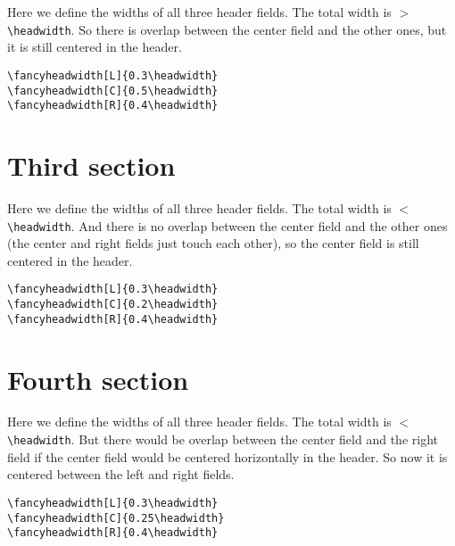 \documentclass[oneside]{report}
\begin{document}
\noindent\begin{boxedminipage}{\textwidth}
  Here we define the widths of all three header fields. The total width
  is $>$ \verb|\headwidth|. So there is overlap between the center field
  and the other ones, but it is still centered in the header.
\begin{verbatim}
\fancyheadwidth[L]{0.3\headwidth}
\fancyheadwidth[C]{0.5\headwidth}
\fancyheadwidth[R]{0.4\headwidth}
\end{verbatim}
\end{boxedminipage}

\fancyheadwidth[L]{0.3\headwidth}
\fancyheadwidth[C]{0.5\headwidth}
\fancyheadwidth[R]{0.4\headwidth}

\newpage

\section{Third section}


\noindent\begin{boxedminipage}{\textwidth}
  Here we define the widths of all three header fields. The total width
  is $<$ \verb|\headwidth|. And there is no overlap between the center
  field and the other ones (the center and right fields just touch each other),
  so the center field is still centered in the header.

\begin{verbatim}
\fancyheadwidth[L]{0.3\headwidth}
\fancyheadwidth[C]{0.2\headwidth}
\fancyheadwidth[R]{0.4\headwidth}
\end{verbatim}
\end{boxedminipage}

\fancyheadwidth[L]{0.3\headwidth}
\fancyheadwidth[C]{0.2\headwidth}
\fancyheadwidth[R]{0.4\headwidth}

\newpage

\section{Fourth section}

\noindent\begin{boxedminipage}{\textwidth}
  Here we define the widths of all three header fields. The total width
  is $<$ \verb|\headwidth|. But there would be overlap between the center
  field and the right field if the center field would be centered horizontally in the header.
  So now it is centered between the left and right fields.

\begin{verbatim}
\fancyheadwidth[L]{0.3\headwidth}
\fancyheadwidth[C]{0.25\headwidth}
\fancyheadwidth[R]{0.4\headwidth}
\end{verbatim}
\end{boxedminipage}
\end{document}
